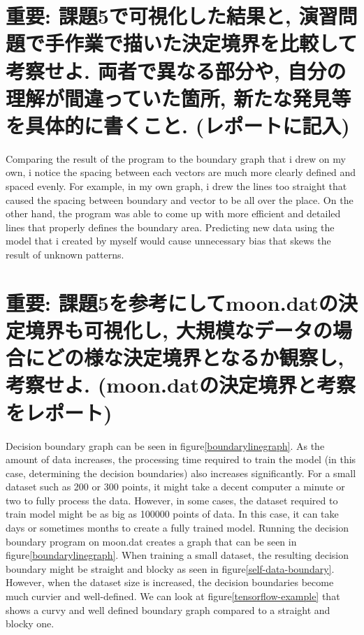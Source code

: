 \documentclass[a4j, twocolumn]{jarticle}
\begin{document}
\section{重要: 課題5で可視化した結果と, 演習問題で手作業で描いた決定境界を比較して考察せよ. 両者で異なる部分や, 自分の理解が間違っていた箇所, 新たな発見等を具体的に書くこと. (レポートに記入)}
Comparing the result of the program to the boundary graph that i drew on my own, i notice the spacing between each vectors are much more clearly defined and spaced evenly. For example, in my own graph, i drew the lines too straight that caused the spacing between boundary and vector to be all over the place. On the other hand, the program was able to come up with more efficient and detailed lines that properly defines the boundary area. Predicting new data using the model that i created by myself would cause unnecessary bias that skews the result of unknown patterns. 
\section{重要: 課題5を参考にしてmoon.datの決定境界も可視化し, 大規模なデータの場合にどの様な決定境界となるか観察し, 考察せよ. (moon.datの決定境界と考察をレポート)}
Decision boundary graph can be seen in figure\ref{boundarylinegraph}. As the amount of data increases, the processing time required to train the model (in this case, determining the decision boundaries) also increases significantly. For a small dataset such as 200 or 300 points, it might take a decent computer a minute or two to fully process the data. However, in some cases, the dataset required to train model might be as big as 100000 points of data. In this case, it can take days or sometimes months to create a fully trained model. 
Running the decision boundary program on moon.dat creates a graph that can be seen in figure\ref{boundarylinegraph}. When training a small dataset, the resulting decision boundary might be straight and blocky as seen in figure\ref{self-data-boundary}. However, when the dataset size is increased, the decision boundaries become much curvier and well-defined. We can look at figure\ref{tensorflow-example} that shows a curvy and well defined boundary graph compared to a straight and blocky one.
\end{document}
